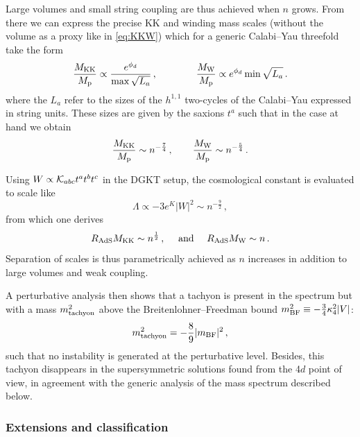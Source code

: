 \documentclass[11pt, a4paper]{article}
\newcommand{\K}{{\cal K}}
\newcommand{\MK}{M_{\rm KK}}
\newcommand{\MW}{M_{\rm W}}
\newcommand{\Mp}{M_{\rm p}}
\newcommand{\Rads}{R_{\rm AdS}}
\newcommand{\half}{\frac{1}{2}}
\begin{document}
%
Large volumes and small string coupling are thus achieved when $n$ grows. From there we can express the precise KK and winding mass scales (without the volume as a proxy like in \eqref{eq:KKW}) which for a generic Calabi--Yau threefold take the form
\begin{equation}
\label{eq:KKW_CY}
\frac{\MK}{\Mp}\propto\frac{e^{\phi_d}}{\max \sqrt{L_a}}\, ,\qquad\qquad \frac{\MW}{\Mp}\propto e^{\phi_d}\min \sqrt{L_a}\, .
\end{equation}
%
where the $L_a$ refer to the sizes of the $h^{1,1}$ two-cycles of the Calabi--Yau expressed in string units. These sizes are given by the saxions $t^a$ such that in the case at hand we obtain
\begin{equation}
\label{eq:scaling_MKK}
\frac{\MK}{\Mp}\sim n^{-\frac{7}{4}}\, ,\qquad \frac{\MW}{\Mp}\sim n^{-\frac{5}{4}}\, .
\end{equation}

Using $W\propto \K_{abc}t^at^bt^c$ in the DGKT setup, the cosmological constant is evaluated to scale like
\begin{equation}
\label{eq:scaling_Lambda}
\Lambda\propto-3e^K|W|^2\sim n^{-\frac{9}{2}}\, ,    
\end{equation}
%
from which one derives
\begin{equation}
\label{eq:sep_DGKT}
\Rads\MK\sim n^\half\, ,\quad\text{ and }\quad \Rads\MW\sim n\, .
\end{equation}
%
Separation of scales is thus parametrically achieved as $n$ increases in addition to large volumes and weak coupling.

A perturbative analysis \cite{DeWolfe:2005uu} then shows that a tachyon is present in the spectrum but with a mass $m_{\rm tachyon}^2$ above the Breitenlohner--Freedman bound \cite{Breitenlohner:1982bm,Breitenlohner:1982jf} $m_{\rm BF}^2\equiv -\frac{3}{4}\kappa_4^2|V|$:
\begin{equation}
m_{\rm tachyon}^2=-\frac{8}{9}|m_{\rm BF}|^2\, ,
\end{equation}
%
such that no instability is generated at the perturbative level. Besides, this tachyon disappears in the supersymmetric solutions found from the 4$d$ point of view, in agreement with the generic analysis of the mass spectrum described below.

\subsubsection{Extensions and classification}
\end{document}
